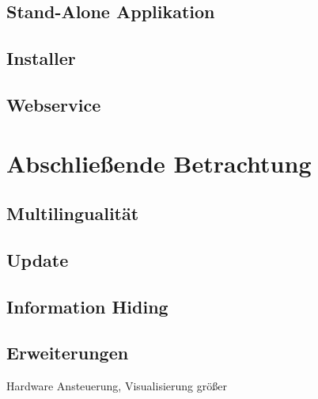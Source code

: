 	\subsection{Stand-Alone Applikation}
	\subsection{Installer}
	\subsection{Webservice}

\section{Abschließende Betrachtung}
	\subsection{Multilingualität}
	\subsection{Update }%
	\subsection{Information Hiding} %
	\subsection{Erweiterungen}
	Hardware Ansteuerung, Visualisierung größer


